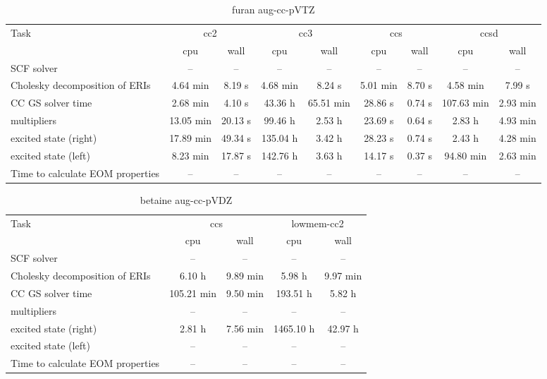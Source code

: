 \documentclass{article}
\begin{document}
\begin{table}
\caption{furan aug-cc-pVTZ}
\begin{tabular}{lcccccccc}
\toprule
Task & \multicolumn{2}{c}{cc2} & \multicolumn{2}{c}{cc3} & \multicolumn{2}{c}{ccs} & \multicolumn{2}{c}{ccsd}\\
\cmidrule(lr){2-3}\cmidrule(lr){4-5}\cmidrule(lr){6-7}\cmidrule(lr){8-9}
 & cpu & wall & cpu & wall & cpu & wall & cpu & wall\\
\midrule
SCF solver & -- & -- & -- & -- & -- & -- & -- & --\\
Cholesky decomposition of ERIs & 4.64 min & 8.19 s & 4.68 min & 8.24 s & 5.01 min & 8.70 s & 4.58 min & 7.99 s\\
CC GS solver time & 2.68 min & 4.10 s & 43.36 h & 65.51 min & 28.86 s & 0.74 s & 107.63 min & 2.93 min\\
multipliers & 13.05 min & 20.13 s & 99.46 h & 2.53 h & 23.69 s & 0.64 s & 2.83 h & 4.93 min\\
excited state (right) & 17.89 min & 49.34 s & 135.04 h & 3.42 h & 28.23 s & 0.74 s & 2.43 h & 4.28 min\\
excited state (left) & 8.23 min & 17.87 s & 142.76 h & 3.63 h & 14.17 s & 0.37 s & 94.80 min & 2.63 min\\
Time to calculate EOM properties & -- & -- & -- & -- & -- & -- & -- & --\\
\bottomrule
\end{tabular}
\end{table}
\begin{table}
\caption{betaine aug-cc-pVDZ}
\begin{tabular}{lcccc}
\toprule
Task & \multicolumn{2}{c}{ccs} & \multicolumn{2}{c}{lowmem-cc2}\\
\cmidrule(lr){2-3}\cmidrule(lr){4-5}
 & cpu & wall & cpu & wall\\
\midrule
SCF solver & -- & -- & -- & --\\
Cholesky decomposition of ERIs & 6.10 h & 9.89 min & 5.98 h & 9.97 min\\
CC GS solver time & 105.21 min & 9.50 min & 193.51 h & 5.82 h\\
multipliers & -- & -- & -- & --\\
excited state (right) & 2.81 h & 7.56 min & 1465.10 h & 42.97 h\\
excited state (left) & -- & -- & -- & --\\
Time to calculate EOM properties & -- & -- & -- & --\\
\bottomrule
\end{tabular}
\end{table}
\end{document}
